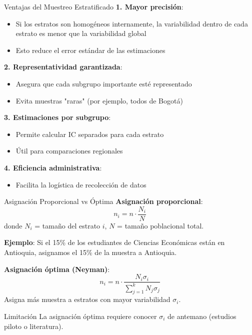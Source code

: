 \documentclass[aspectratio=169, 11pt]{beamer}
\begin{document}
\begin{frame}{Ventajas del Muestreo Estratificado}
\textbf{1. Mayor precisión}:
\begin{itemize}
  \item Si los estratos son homogéneos internamente, la variabilidad dentro de cada estrato es menor que la variabilidad global
  \item Esto reduce el error estándar de las estimaciones
\end{itemize}

\vspace{0.3cm}
\textbf{2. Representatividad garantizada}:
\begin{itemize}
  \item Asegura que cada subgrupo importante esté representado
  \item Evita muestras "raras" (por ejemplo, todos de Bogotá)
\end{itemize}

\vspace{0.3cm}
\textbf{3. Estimaciones por subgrupo}:
\begin{itemize}
  \item Permite calcular IC separados para cada estrato
  \item Útil para comparaciones regionales
\end{itemize}

\vspace{0.3cm}
\textbf{4. Eficiencia administrativa}:
\begin{itemize}
  \item Facilita la logística de recolección de datos
\end{itemize}
\end{frame}

\begin{frame}{Asignación Proporcional vs Óptima}
\textbf{Asignación proporcional}:
\[
n_i = n \cdot \frac{N_i}{N}
\]
donde $N_i$ = tamaño del estrato $i$, $N$ = tamaño poblacional total.

\vspace{0.3cm}
\textbf{Ejemplo}: Si el 15\% de los estudiantes de Ciencias Econ\'omicas están en Antioquia, asignamos el 15\% de la muestra a Antioquia.

\vspace{0.3cm}
\textbf{Asignación óptima (Neyman)}:
\[
n_i = n \cdot \frac{N_i \sigma_i}{\sum_{j=1}^k N_j \sigma_j}
\]
Asigna más muestra a estratos con \alert{mayor variabilidad} $\sigma_i$.

\vspace{0.3cm}
\begin{alertblock}{Limitación}
La asignación óptima requiere conocer $\sigma_i$ de antemano (estudios piloto o literatura).
\end{alertblock}
\end{frame}
\end{document}
